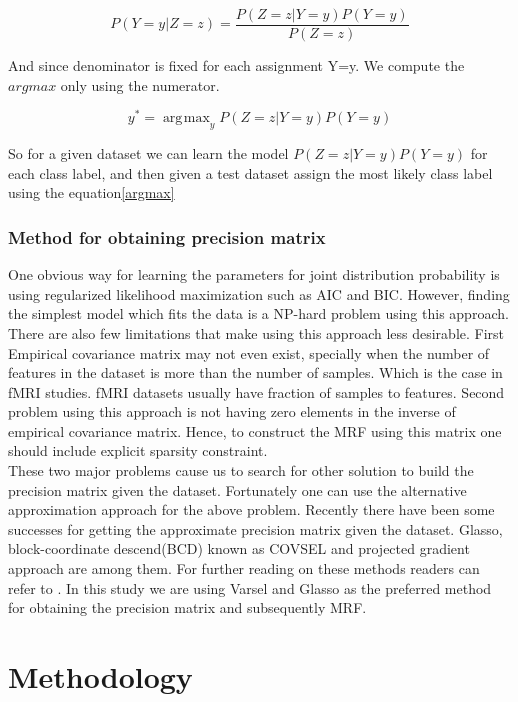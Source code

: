 \documentclass{article} %
\DeclareMathOperator*{\argmax}{\arg\!\max}
\begin{document}
\begin{equation}
P(Y=y|Z=z) = \frac{P(Z=z|Y=y)P(Y=y)}{P(Z=z)}
\end{equation}  

And since denominator is fixed for each assignment Y=y. We compute the $argmax$ only using the numerator. 

\begin{equation}\label{argmax}
y^* = \argmax_{y} P(Z=z|Y=y)P(Y=y) 
\end{equation} 

So for a given dataset we can learn the model $ P(Z=z|Y=y)P(Y=y)$ for each 
class label, and then given a test dataset assign the most likely class 
label using the equation\eqref{argmax} \cite{Rish2014Book}  

\subsubsection{Method for obtaining precision matrix}  
One obvious way for learning the parameters for joint distribution probability 
is using regularized likelihood maximization such as AIC and BIC. However, 
finding the simplest model which fits the data is a NP-hard problem using this 
approach. There are also few limitations that make using this approach less 
desirable. First Empirical covariance matrix may not even exist, specially when 
the number of features in the dataset is more than the number of samples. Which 
is the case in fMRI studies. fMRI datasets usually have fraction of samples to 
features. Second problem using this approach is not having zero elements in the 
inverse of empirical covariance matrix. Hence, to construct the MRF using this 
matrix one should include explicit sparsity constraint.\cite{Rish2014Book} \\

These two major problems cause us to search for other solution to build the 
precision matrix given the dataset. Fortunately one can use the alternative 
approximation approach for the above problem. Recently there have been some 
successes for getting the approximate precision matrix given the dataset. 
Glasso\cite{glasso}, block-coordinate descend(BCD) known as COVSEL and projected gradient 
approach are among them. For further reading on these methods readers can 
refer to \cite{Rish2014Book}. In this study we are using Varsel and Glasso as 
the preferred method for obtaining the precision matrix and subsequently MRF.   


\section{Methodology}
\end{document}
